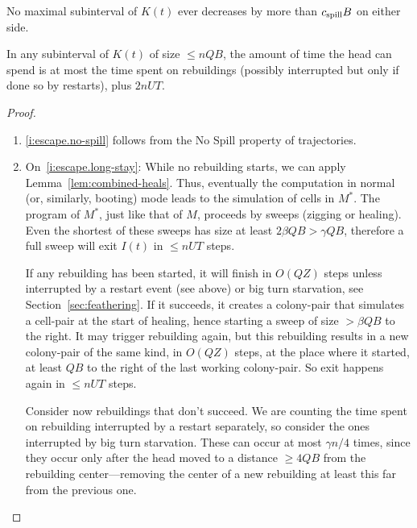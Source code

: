 \documentclass[11pt]{memoir}
\theoremstyle{definition} %
\renewcommand{\le}{\leq}
\renewcommand{\ge}{\geq}
\def\B{B}
\def\U{U}
\newcommand{\Q}{Q} %
\newcommand{\Tu}{T}
\newcommand{\Z}{Z} %
\newcommand{\cns}[1]{c_{\textrm{\upshape #1}}}
\newcommand{\CSpill}{\cns{spill}}
\begin{document}
\begin{lemma}\label{lem:escape.inside-hole}
 \begin{alphenum}
 \item\label{i:escape.no-spill} No maximal subinterval of \( K(t) \) ever
   decreases by more than \( \CSpill\B \) on either side. 
\item\label{i:escape.long-stay}
  In any subinterval of  \( K(t) \) of size \( \le n\Q\B \),
  the amount of time the head can spend is at most the time spent on
  rebuildings (possibly interrupted but only if done so by restarts), plus \( 2 n\U\Tu \).
  \end{alphenum}
\end{lemma}
\begin{proof}
  \begin{enumerate}
  \item 
  \eqref{i:escape.no-spill} follows from the No Spill property of trajectories.
\item\label{i:escape.inside-hole.long-stay} On~\eqref{i:escape.long-stay}:  
  While no rebuilding starts, we can apply Lemma~\ref{lem:combined-heals}.
  Thus, eventually the computation in normal (or, similarly, booting)
  mode leads to the simulation of cells in \( M^{*} \).
  The program of \( M^{*} \), just like that of \( M \), proceeds by sweeps (zigging or healing).
  Even the shortest of these sweeps
  has size at least \( 2\beta\Q\B >\gamma\Q\B \), therefore a full sweep
  will exit \( I(t) \) in \( \le n\U\Tu \) steps.

  If any rebuilding has been started, it will finish in \( O(\Q\Z) \) steps unless
  interrupted by a restart event (see above) or big turn starvation, see Section~\ref{sec:feathering}.
  If it succeeds, it creates a colony-pair that simulates a cell-pair at the start of
  healing, hence starting a sweep of size \( >\beta\Q\B \) to the right.
  It may trigger rebuilding again, but this rebuilding
  results in a new colony-pair of the same kind, in \( O(\Q\Z) \) steps, at the place
  where it started, at least \( \Q\B \) to the right of the last working colony-pair.
  So exit happens again in \( \le n\U\Tu \) steps.

  Consider now rebuildings that don't succeed.
  We are counting the time spent on rebuilding interrupted by a restart separately, so
  consider the ones interrupted by big turn starvation.
  These can occur at most \( \gamma n/4 \) times,
  since they occur only after the head moved to a distance \( \ge 4\Q\B \) from
  the rebuilding center---removing the center of a new rebuilding at least this far
  from the previous one.
    \end{enumerate}
  \end{proof}
\end{document}
